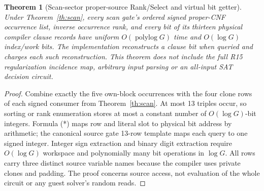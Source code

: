 \documentclass[11pt]{article}
\newtheorem{theorem}{Theorem}
\begin{document}
\begin{theorem}[Scan-sector proper-source Rank/Select and virtual bit getter]\label{th:cnf}
Under Theorem~\ref{th:scan}, every scan gate's ordered signed proper-CNF occurrence list, inverse occurrence rank, and every bit of its thirteen physical compiler clause records have uniform $O(\operatorname{polylog}G)$ time and $O(\log G)$ index/work bits. The implementation reconstructs a clause bit when queried and charges each such reconstruction. This theorem does not include the full R15 regularization incidence map, arbitrary input parsing or an all-input SAT decision circuit.
\end{theorem}
\begin{proof}
Combine exactly the five own-block occurrences with the four clone rows of each signed consumer from Theorem~\ref{th:scan}. At most 13 triples occur, so sorting or rank enumeration stores at most a constant number of $O(\log G)$-bit integers. Formula (*) maps row and literal slot to physical bit address by arithmetic; the canonical source gate 13-row template maps each query to one signed integer. Integer sign extraction and binary digit extraction require $O(\log G)$ workspace and polynomially many bit operations in $\log G$. All rows carry three distinct source variable names because the compiler uses private clones and padding. The proof concerns source access, not evaluation of the whole circuit or any guest solver's random reads.
\end{proof}
\end{document}
